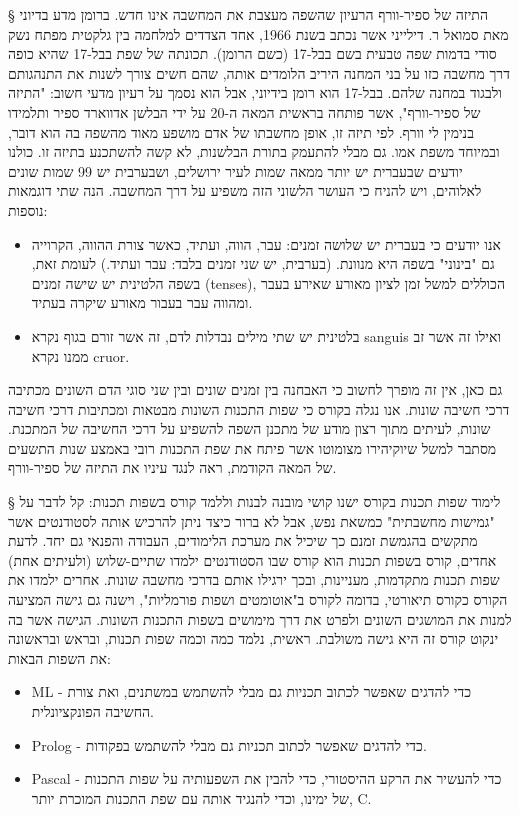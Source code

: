 § התיזה של ספיר-וורף
הרעיון שהשפה מעצבת את המחשבה אינו חדש. ברומן מדע בדיוני מאת סמואל ר. דילייני
אשר נכתב בשנת 1966, אחד הצדדים למלחמה בין גלקטית מפתח נשק סודי בדמות שפה טבעית
בשם בבל-17 (כשם הרומן). תכונתה של שפת בבל-17 שהיא כופה דרך מחשבה כזו על בני
המחנה היריב הלומדים אותה, שהם חשים צורך לשנות את התנהגותם ולבגוד במחנה שלהם.
בבל-17 הוא רומן בידיוני, אבל הוא נסמך על רעיון מדעי חשוב: "התיזה של ספיר-וורף",
אשר פותחה בראשית המאה ה-20 על ידי הבלשן אדווארד ספיר ותלמידו בנימין לי וורף.
לפי תיזה זו, אופן מחשבתו של אדם מושפע מאוד מהשפה בה הוא דובר, ובמיוחד משפת אמו.
גם מבלי להתעמק בתורת הבלשנות, לא קשה להשתכנע בתיזה זו. כולנו יודעים שבעברית יש
יותר ממאה שמות לעיר ירושלים, ושבערבית יש 99 שמות שונים לאלוהים, ויש להניח כי
העושר הלשוני הזה משפיע על דרך המחשבה. 
הנה שתי דוגמאות נוספות:
\begin{itemize}
         \item אנו יודעים כי בעברית יש שלושה זמנים: עבר, הווה, ועתיד, כאשר צורת
           ההווה, הקרוייה גם "בינוני" בשפה היא מנוונת. (בערבית, יש שני זמנים
           בלבד: עבר ועתיד.) לעומת זאת, בשפה הלטינית יש שישה זמנים (tenses),
           הכוללים למשל זמן לציון מאורע שאירע בעבר ומהווה עבר בעבור מאורע שיקרה
           בעתיד.  
         \item בלטינית יש שתי מילים נבדלות לדם, זה אשר זורם בגוף נקרא sanguis
       ואילו זה אשר זב ממנו נקרא cruor.  
   \end{itemize}
גם כאן, אין זה מופרך לחשוב  כי האבחנה בין זמנים שונים ובין שני סוגי הדם השונים
מכתיבה דרכי חשיבה שונות.  אנו נגלה בקורס כי שפות התכנות השונות מבטאות ומכתיבות
דרכי חשיבה שונות, לעיתים מתוך רצון מודע של מתכנן השפה להשפיע על דרכי החשיבה של
המתכנת. מסתבר למשל שיוקיהירו מצומוטו אשר פיתח את שפת התכנות רובי באמצע שנות
התשעים של המאה הקודמת, ראה לנגד עיניו את התיזה של ספיר-וורף.

§ לימוד שפות תכנות בקורס
ישנו קושי מובנה לבנות וללמד קורס בשפות תכנות: קל לדבר על "גמישות מחשבתית" כמשאת
נפש, אבל לא ברור כיצד ניתן להרכיש אותה לסטודנטים אשר מתקשים בהגמשת זמנם כך
שיכיל את מערכת הלימודים, העבודה והפנאי גם יחד.  לדעת אחדים, קורס בשפות תכנות
הוא קורס שבו הסטודנטים ילמדו שתיים-שלוש (ולעיתים אחת) שפות תכנות מתקדמות,
מעניינות, ובכך ירגילו אותם בדרכי מחשבה שונות.  אחרים ילמדו את הקורס כקורס
תיאורטי, בדומה לקורס ב"אוטומטים ושפות פורמליות", וישנה גם גישה המציעה למנות את
המושגים השונים ולפרט את דרך מימושים בשפות התכנות השונות.
הגישה אשר בה ינקוט קורס זה היא גישה משולבת. ראשית, נלמד כמה וכמה שפות תכנות,
ובראש ובראשונה את השפות הבאות: 
  \begin{itemize}
         \item ML - כדי להדגים שאפשר לכתוב תכניות גם מבלי להשתמש במשתנים, ואת
           צורת החשיבה הפונקציונלית.

         \item Prolog - כדי להדגים שאפשר לכתוב תכניות גם מבלי להשתמש בפקודות.

         \item Pascal - כדי להעשיר את הרקע ההיסטורי, כדי להבין את השפעותיה על
           שפות התכנות של ימינו, וכדי להנגיד אותה עם שפת התכנות המוכרת יותר, C.

\end{itemize}

